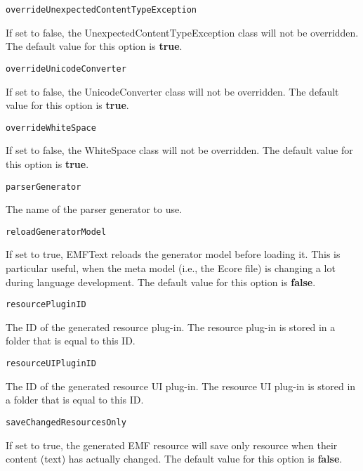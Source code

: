 \noindent\texttt{overrideUnexpectedContentTypeException}
\begin{myindentpar}{1cm}
If set to false, the UnexpectedContentTypeException class will not be overridden. The default value for this option is \textbf{true}.
\end{myindentpar}

\noindent\texttt{overrideUnicodeConverter}
\begin{myindentpar}{1cm}
If set to false, the UnicodeConverter class will not be overridden. The default value for this option is \textbf{true}.
\end{myindentpar}

\noindent\texttt{overrideWhiteSpace}
\begin{myindentpar}{1cm}
If set to false, the WhiteSpace class will not be overridden. The default value for this option is \textbf{true}.
\end{myindentpar}

\noindent\texttt{parserGenerator}
\begin{myindentpar}{1cm}
The name of the parser generator to use.
\end{myindentpar}

\noindent\texttt{reloadGeneratorModel}
\begin{myindentpar}{1cm}
If set to true, EMFText reloads the generator model before loading it. This is particular useful, when the meta model (i.e., the Ecore file) is changing a lot during language development. The default value for this option is \textbf{false}.
\end{myindentpar}

\noindent\texttt{resourcePluginID}
\begin{myindentpar}{1cm}
The ID of the generated resource plug-in. The resource plug-in is stored in a folder that is equal to this ID.
\end{myindentpar}

\noindent\texttt{resourceUIPluginID}
\begin{myindentpar}{1cm}
The ID of the generated resource UI plug-in. The resource UI plug-in is stored in a folder that is equal to this ID.
\end{myindentpar}

\noindent\texttt{saveChangedResourcesOnly}
\begin{myindentpar}{1cm}
If set to true, the generated EMF resource will save only resource when their content (text) has actually changed. The default value for this option is \textbf{false}.
\end{myindentpar}

